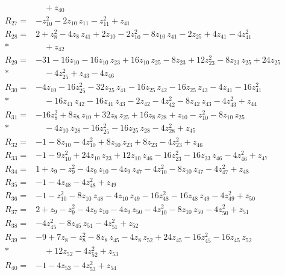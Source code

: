 \begin{align*}
&\quad  + z_{40} \\[2pt]
R_{27}={}& -z_{10}^{2} - 2z_{10}\,z_{11} - z_{11}^{2} + z_{41} \\[2pt]
R_{28}={}& 2 + z_{8}^{2} - 4z_{8}\,z_{41} + 2z_{10} - 2z_{10}^{2} - 8z_{10}\,z_{41} - 2z_{25} + 4z_{41} - 4z_{41}^{2} \\*
&\quad  + z_{42} \\[2pt]
R_{29}={}& -31 - 16z_{10} - 16z_{10}\,z_{23} + 16z_{10}\,z_{25} - 8z_{23} + 12z_{23}^{2} - 8z_{23}\,z_{25} + 24z_{25} \\*
&\quad  - 4z_{25}^{2} + z_{43} - 4z_{46} \\[2pt]
R_{30}={}& -4z_{10} - 16z_{25}^{2} - 32z_{25}\,z_{41} - 16z_{25}\,z_{42} - 16z_{25}\,z_{43} - 4z_{41} - 16z_{41}^{2} \\*
&\quad  - 16z_{41}\,z_{42} - 16z_{41}\,z_{43} - 2z_{42} - 4z_{42}^{2} - 8z_{42}\,z_{43} - 4z_{43}^{2} + z_{44} \\[2pt]
R_{31}={}& -16z_{8}^{2} + 8z_{8}\,z_{10} + 32z_{8}\,z_{25} + 16z_{8}\,z_{28} + z_{10} - z_{10}^{2} - 8z_{10}\,z_{25} \\*
&\quad  - 4z_{10}\,z_{28} - 16z_{25}^{2} - 16z_{25}\,z_{28} - 4z_{28}^{2} + z_{45} \\[2pt]
R_{32}={}& -1 - 8z_{10} - 4z_{10}^{2} + 8z_{10}\,z_{23} + 8z_{23} - 4z_{23}^{2} + z_{46} \\[2pt]
R_{33}={}& -1 - 9z_{10}^{2} + 24z_{10}\,z_{23} + 12z_{10}\,z_{46} - 16z_{23}^{2} - 16z_{23}\,z_{46} - 4z_{46}^{2} + z_{47} \\[2pt]
R_{34}={}& 1 + z_{9} - z_{9}^{2} - 4z_{9}\,z_{10} - 4z_{9}\,z_{47} - 4z_{10}^{2} - 8z_{10}\,z_{47} - 4z_{47}^{2} + z_{48} \\[2pt]
R_{35}={}& -1 - 4z_{48} - 4z_{48}^{2} + z_{49} \\[2pt]
R_{36}={}& -1 - z_{10}^{2} - 8z_{10}\,z_{48} - 4z_{10}\,z_{49} - 16z_{48}^{2} - 16z_{48}\,z_{49} - 4z_{49}^{2} + z_{50} \\[2pt]
R_{37}={}& 2 + z_{9} - z_{9}^{2} - 4z_{9}\,z_{10} - 4z_{9}\,z_{50} - 4z_{10}^{2} - 8z_{10}\,z_{50} - 4z_{50}^{2} + z_{51} \\[2pt]
R_{38}={}& -4z_{45}^{2} - 8z_{45}\,z_{51} - 4z_{51}^{2} + z_{52} \\[2pt]
R_{39}={}& -9 + 7z_{8} - z_{8}^{2} - 8z_{8}\,z_{45} - 4z_{8}\,z_{52} + 24z_{45} - 16z_{45}^{2} - 16z_{45}\,z_{52} \\*
&\quad  + 12z_{52} - 4z_{52}^{2} + z_{53} \\[2pt]
R_{40}={}& -1 - 4z_{53} - 4z_{53}^{2} + z_{54} \\[2pt]

\end{align*}
